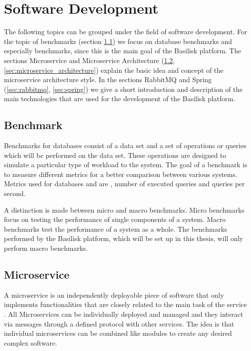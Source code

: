 \section{Software Development}
The following topics can be grouped under the field of software development.
For the topic of benchmarks (section \ref{sec:benchmark}) we focus on database benchmarks and especially \ts{} benchmarks, since this is the main goal of the Basilisk platform.
The sections Microservice and Microservice Architecture (\ref{sec:microservice}, \ref{sec:microservice_architecture}) explain the basic idea and concept of the microservice architecture style.
In the sections RabbitMQ and Spring (\ref{sec:rabbitmq}, \ref{sec:spring}) we give a short introduction and description of the main technologies that are used for the development of the Basilisk platform.

\subsection{Benchmark}
\label{sec:benchmark}
Benchmarks for databases consist of a data set and a set of operations or queries which will be performed on the data set.
These operations are designed to simulate a particular type of workload to the system.
The goal of a benchmark is to measure different metrics for a better comparison between various systems.
Metrics used for databases and \tsp{} are \eg, number of executed queries and queries per second\cite{IguanaDocumentationMetrics}.

A distinction is made between micro and macro benchmarks.
Micro benchmarks focus on testing the performance of single components of a system.
Macro benchmarks test the performance of a system as a whole.
The benchmarks performed by the Basilisk platform, which will be set up in this thesis, will only perform macro benchmarks.

\subsection{Microservice}
\label{sec:microservice}
A microservice is an independently deployable piece of software that only implements functionalities that are closely related to the main task of the service \cite{dragoniMicroservicesYesterdayToday2017}.
All Microservices can be individually deployed and managed and they interact via messages through a defined protocol with other services.
The idea is that individual microservices can be combined like modules to create any desired complex software.

